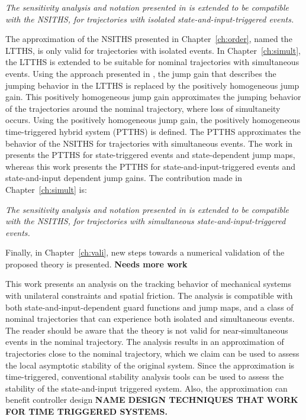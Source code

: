 \documentclass[../DC2017114Bouma.tex]{subfiles}
\begin{document}
\textit{The sensitivity analysis and notation presented in \cite{Rijnen2018a} is extended to be compatible with the NSITHS, for trajectories with isolated state-and-input-triggered events.}

The approximation of the NSITHS presented in Chapter~\ref{ch:order}, named the LTTHS, is only valid for trajectories with isolated events. In Chapter~\ref{ch:simult}, the LTTHS is extended to be suitable for nominal trajectories with simultaneous events. Using the approach presented in \cite{Rijnen2018}, the jump gain that describes the jumping behavior in the LTTHS is replaced by the positively homogeneous jump gain. This positively homogeneous jump gain approximates the jumping behavior of the trajectories around the nominal trajectory, where loss of simultaneity occurs. Using the positively homogeneous jump gain, the positively homogeneous time-triggered hybrid system (PTTHS) is defined. The PTTHS approximates the behavior of the NSITHS for trajectories with simultaneous events. The work in \cite{Rijnen2018a} presents the PTTHS for state-triggered events and state-dependent jump maps, whereas this work presents the PTTHS for state-and-input-triggered events and state-and-input dependent jump gains. The contribution made in Chapter~\ref{ch:simult} is:

\textit{The sensitivity analysis and notation presented in \cite{Rijnen2018a} is extended to be compatible with the NSITHS, for trajectories with simultaneous state-and-input-triggered events.}

Finally, in Chapter~\ref{ch:vali}, new steps towards a numerical validation of the proposed theory is presented. \textbf{Needs more work}

This work presents an analysis on the tracking behavior of mechanical systems with unilateral constraints and spatial friction. The analysis is compatible with both state-and-input-dependent guard functions and jump maps, and a class of nominal trajectories that can experience both isolated and simultaneous events. The reader should be aware that the theory is not valid for near-simultaneous events in the nominal trajectory. The analysis results in an approximation of trajectories close to the nominal trajectory, which we claim can be used to assess the local asymptotic stability of the original system. Since the approximation is time-triggered, conventional stability analysis tools can be used to assess the stability of the state-and-input triggered system. Also, the approximation can benefit controller design \textbf{NAME DESIGN TECHNIQUES THAT WORK FOR TIME TRIGGERED SYSTEMS.}
\end{document}
